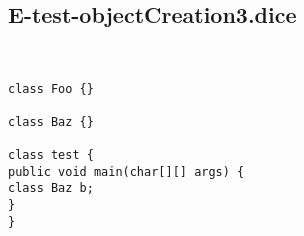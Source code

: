 \subsection{E-test-objectCreation3.dice}
\begin{verbatim}


class Foo {}

class Baz {}

class test {
public void main(char[][] args) {
class Baz b;
}
}

\end{verbatim}